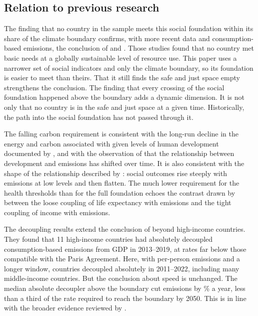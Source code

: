 \subsection{Relation to previous research}

The finding that no country in the sample meets this social foundation within its share of the climate boundary confirms, with more recent data and consumption-based emissions, the conclusion of \citet{oneill2018} and \citet{fanning2022}. Those studies found that no country met basic needs at a globally sustainable level of resource use. This paper uses a narrower set of social indicators and only the climate boundary, so its foundation is easier to meet than theirs. That it still finds the safe and just space empty strengthens the conclusion. The finding that every crossing of the social foundation happened above the boundary adds a dynamic dimension. It is not only that no country is in the safe and just space at a given time. Historically, the path into the social foundation has not passed through it.

The falling carbon requirement is consistent with the long-run decline in the energy and carbon associated with given levels of human development documented by \citet{steinberger2010}, and with the observation of \citet{lamb2015} that the relationship between development and emissions has shifted over time. It is also consistent with the shape of the relationship described by \citet{porcher2026}: social outcomes rise steeply with emissions at low levels and then flatten. The much lower requirement for the health thresholds than for the full foundation echoes the contrast drawn by \citet{steinberger2020} between the loose coupling of life expectancy with emissions and the tight coupling of income with emissions.

The decoupling results extend the conclusion of \citet{vogel2023} beyond high-income countries. They found that 11 high-income countries had absolutely decoupled consumption-based emissions from GDP in 2013--2019, at rates far below those compatible with the Paris Agreement. Here, with per-person emissions and a longer window, \nDecAbsLate{} countries decoupled absolutely in 2011--2022, including many middle-income countries. But the conclusion about speed is unchanged. The median absolute decoupler above the boundary cut emissions by \nDecMedianAchieved\% a year, less than a third of the rate required to reach the boundary by 2050. This is in line with the broader evidence reviewed by \citet{haberl2020}.

